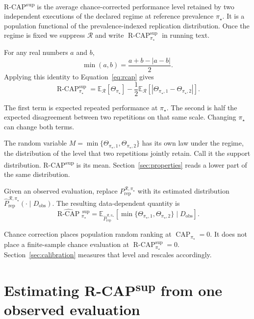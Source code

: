 \documentclass[11pt]{article}
\newcommand{\CAP}{\operatorname{CAP}}
\newcommand{\Regime}{\mathcal{R}}
\newcommand{\Tpi}{\CAP_{\pi_\star}}
\newcommand{\E}{\mathbb{E}}
\newcommand{\RCAP}{\operatorname{R\text{-}CAP}^{\mathrm{sup}}_{\pi_\star}}
\newcommand{\RCAPHat}{\widehat{\operatorname{R\text{-}CAP}}{}^{\,\mathrm{sup}}_{\pi_\star}}
\newcommand{\PRep}{P_{\mathrm{rep}}^{\Regime,\pi_\star}}
\newcommand{\PRepHat}{\widehat{P}_{\mathrm{rep}}^{\Regime,\pi_\star}}
\theoremstyle{remark}
\begin{document}
R-CAP\textsuperscript{sup} is the average chance-corrected performance level retained by two independent executions of the declared regime at reference prevalence $\pi_\star$. It is a population functional of the prevalence-indexed replication distribution. Once the regime is fixed we suppress $\Regime$ and write $\RCAP$ in running text.

For any real numbers $a$ and $b$,
\[
\min(a,b)=\frac{a+b-|a-b|}{2}.
\]
Applying this identity to Equation~\eqref{eq:rcap} gives
\begin{equation}
\RCAP
=
\E_{\Regime}[\Theta_{\pi_\star}]
-
\frac12
\E_{\Regime}
\left[
|\Theta_{\pi_\star,1}-\Theta_{\pi_\star,2}|
\right].
\label{eq:decomposition}
\end{equation}

The first term is expected repeated performance at $\pi_\star$. The second is half the expected disagreement between two repetitions on that same scale. Changing $\pi_\star$ can change both terms.

\begin{center}
\end{center}

The random variable $M=\min\{\Theta_{\pi_\star,1},\Theta_{\pi_\star,2}\}$ has its own law under the regime, the distribution of the level that two repetitions jointly retain. Call it the support distribution. R-CAP\textsuperscript{sup} is its mean. Section~\ref{sec:properties} reads a lower part of the same distribution.

Given an observed evaluation, replace $\PRep$ with its estimated distribution $\PRepHat(\cdot\mid D_{\mathrm{obs}})$. The resulting data-dependent quantity is
\begin{equation}
\RCAPHat
=
\E_{\PRepHat}
\left[
\min\{
\Theta_{\pi_\star,1},
\Theta_{\pi_\star,2}
\}
\mid D_{\mathrm{obs}}
\right].
\label{eq:rcap-estimated}
\end{equation}

Chance correction places population random ranking at $\Tpi=0$. It does not place a finite-sample chance evaluation at $\RCAP=0$. Section~\ref{sec:calibration} measures that level and rescales accordingly.

\section{Estimating R-CAP\textsuperscript{sup} from one observed evaluation}
\label{sec:estimation}
\end{document}
